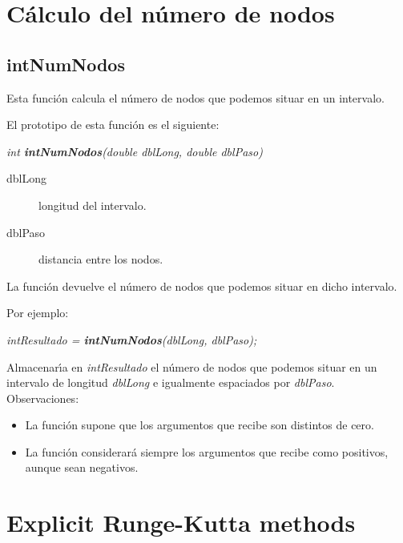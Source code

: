 \section{C\'alculo del n\'umero de nodos}

\subsection{intNumNodos}
Esta funci\'on calcula el n\'umero de nodos que podemos situar en un
intervalo.\newline

El prototipo de esta funci\'on es el siguiente:

\begin{center}
\emph{int \textbf{intNumNodos}(double dblLong, double dblPaso)}
\end{center}

\begin{description}
\item[dblLong] longitud del intervalo.
\item[dblPaso] distancia entre los nodos.
\end{description}

La funci\'on devuelve el n\'umero de nodos que podemos situar en dicho
intervalo.\newline

Por ejemplo:

\begin{center}
\emph{intResultado = \textbf{intNumNodos}(dblLong, dblPaso);}
\end{center}

Almacenar\'{\i}a en \emph{intResultado} el n\'umero de nodos que podemos 
situar en un intervalo de longitud \emph{dblLong} e igualmente espaciados
por \emph{dblPaso}.\\

Observaciones:

\begin{itemize}
\item La funci\'on supone que los argumentos que recibe son distintos de cero.
\item La funci\'on considerar\'a siempre los argumentos que recibe como
positivos, aunque sean negativos.
\end{itemize}

\section{Explicit Runge-Kutta methods}

